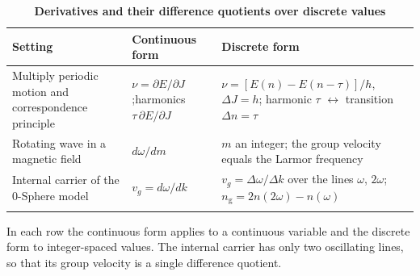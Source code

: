 \documentclass[%
 reprint, amsmath,amssymb, aps, prb, ]{revtex4-2}
\numberwithin{equation}{section}
\newcommand{\ngr}{n_{\mathrm{g}}}
\begin{document}
\begin{table}[t!]
\centering
\caption{\textbf{Derivatives and their difference quotients over discrete values}}
\label{tab:discrete}
\renewcommand{\arraystretch}{1.4}
\begin{tabular}{p{4.3cm}p{4.1cm}p{7.1cm}}
\toprule
\textbf{Setting} & \textbf{Continuous form} & \textbf{Discrete form} \\
\midrule
\raggedright Multiply periodic motion and correspondence principle~\cite{Yukawa1954}
& \raggedright $\nu = \partial E/\partial J$;\newline harmonics $\tau\,\partial E/\partial J$
& \raggedright $\nu = [E(n) - E(n-\tau)]/h$, $\Delta J = h$; harmonic $\tau$ $\leftrightarrow$ transition $\Delta n = \tau$ \tabularnewline
\addlinespace[0.3cm]
\raggedright Rotating wave in a magnetic field~\cite{Yukawa1954}
& \raggedright $d\omega/dm$
& \raggedright $m$ an integer; the group velocity equals the Larmor frequency \tabularnewline
\addlinespace[0.3cm]
\raggedright Internal carrier of the 0-Sphere model~\cite{H66}
& \raggedright $v_g = d\omega/dk$
& \raggedright $v_g = \Delta\omega/\Delta k$ over the lines $\omega$, $2\omega$; $\ngr = 2n(2\omega) - n(\omega)$ \tabularnewline
\addlinespace[0.2cm]
\bottomrule
\end{tabular}
\vspace{0.2cm}
\begin{minipage}{0.95\textwidth}
\justifying\footnotesize
In each row the continuous form applies to a continuous variable and the discrete form to integer-spaced values. The internal carrier has only two oscillating lines, so that its group velocity is a single difference quotient.
\end{minipage}
\end{table}
\end{document}
